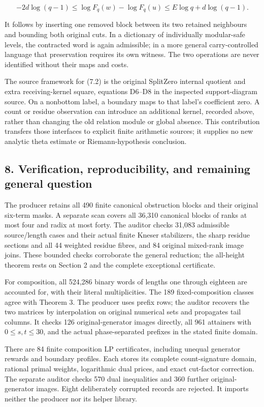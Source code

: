 \[
-2d\log(q-1)\le\log F_q(w)-\log F_q(u)
\le E\log q+d\log(q-1).
\tag{7.4}
\]

It follows by inserting one removed block between its two retained neighbours and bounding both original cuts. In a dictionary of individually modular-safe levels, the contracted word is again admissible; in a more general carry-controlled language that preservation requires its own witness. The two operations are never identified without their maps and costs.

The source framework for (7.2) is the original SplitZero internal quotient and extra receiving-kernel square, equations D6--D8 in the inspected support-diagram source. On a nonbottom label, a boundary maps to that label's coefficient zero. A count or residue observation can introduce an additional kernel, recorded above, rather than changing the old relation module or global absence. This contribution transfers those interfaces to explicit finite arithmetic sources; it supplies no new analytic theta estimate or Riemann-hypothesis conclusion.

\subsection{8. Verification, reproducibility, and remaining general question}\label{verification-reproducibility-and-remaining-general-question}

The producer retains all 490 finite canonical obstruction blocks and their original six-term masks. A separate scan covers all 36,310 canonical blocks of ranks at most four and radix at most forty. The auditor checks 31,083 admissible source/length cases and their actual finite Kneser stabilizers, the sharp residue sections and all 44 weighted residue fibres, and 84 original mixed-rank image joins. These bounded checks corroborate the general reduction; the all-height theorem rests on Section 2 and the complete exceptional certificate.

For composition, all 524,286 binary words of lengths one through eighteen are accounted for, with their literal multiplicities. The 189 fixed-composition classes agree with Theorem 3. The producer uses prefix rows; the auditor recovers the two matrices by interpolation on original numerical sets and propagates tail columns. It checks 126 original-generator images directly, all 961 attainers with \(0\le s,t\le30\), and the actual phase-separated prefixes in the stated finite domain.

There are 84 finite composition LP certificates, including unequal generator rewards and boundary profiles. Each stores its complete count-signature domain, rational primal weights, logarithmic dual prices, and exact cut-factor correction. The separate auditor checks 570 dual inequalities and 360 further original-generator images. Eight deliberately corrupted records are rejected. It imports neither the producer nor its helper library.

